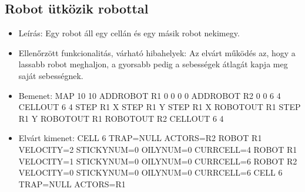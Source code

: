 \subsection{Robot ütközik robottal}
\begin{itemize}
	\item Leírás: \newline
	Egy robot áll egy cellán és egy másik robot nekimegy. 
	\item Ellenőrzött funkcionalitás, várható hibahelyek: \newline
	Az elvárt működés az, hogy a lassabb robot meghaljon, a gyorsabb pedig a sebességek átlagát kapja meg saját sebességnek.
	\item Bemenet: \newline
	MAP 10 10 \newline
	ADDROBOT R1 0 0 0 0 \newline
	ADDROBOT R2 0 0 6 4 \newline
	CELLOUT 6 4 \newline
	STEP R1 X \newline
	STEP R1 Y \newline
	STEP R1 X \newline
	ROBOTOUT R1 \newline
	STEP R1 Y \newline
	ROBOTOUT R1 \newline
	ROBOTOUT R2 \newline
	CELLOUT 6 4 \newline

	\item Elvárt kimenet: \newline
	CELL 6 TRAP=NULL ACTORS=R2 \newline
	ROBOT R1 VELOCITY=2 STICKYNUM=0 OILYNUM=0 CURRCELL=4 \newline
	ROBOT R1 VELOCITY=1 STICKYNUM=0 OILYNUM=0 CURRCELL=6 \newline
	ROBOT R2 VELOCITY=0 STICKYNUM=0 OILYNUM=0 CURRCELL=6 \newline
	CELL 6 TRAP=NULL ACTORS=R1 \newline

\end{itemize}

